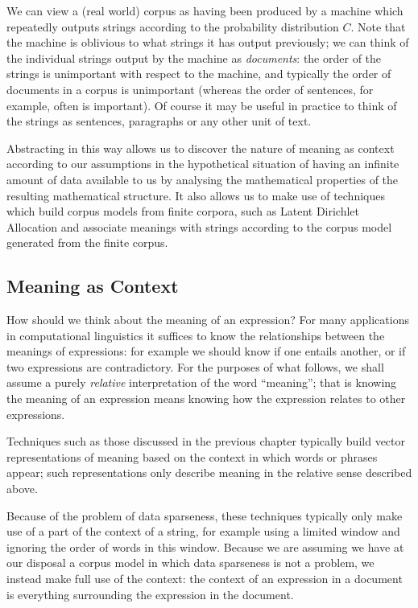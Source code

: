 We can view a (real world) corpus as having been produced by a machine which repeatedly outputs strings according to the probability distribution $C$. Note that the machine is oblivious to what strings it has output previously; we can think of the individual strings output by the machine as \emph{documents}: the order of the strings is unimportant with respect to the machine, and typically the order of documents in a corpus is unimportant (whereas the order of sentences, for example, often is important). Of course it may be useful in practice to think of the strings as sentences, paragraphs or any other unit of text.

Abstracting in this way allows us to discover the nature of meaning as context according to our assumptions in the hypothetical situation of having an infinite amount of data available to us by analysing the mathematical properties of the resulting mathematical structure. It also allows us to make use of techniques which build corpus models from finite corpora, such as Latent Dirichlet Allocation and associate meanings with strings according to the corpus model generated from the finite corpus.

\subsection{Meaning as Context}

 How should we think about the meaning of an expression? For many applications in computational linguistics it suffices to know the relationships between the meanings of expressions: for example we should know if one entails another, or if two expressions are contradictory. For the purposes of what follows, we shall assume a purely \emph{relative} interpretation of the word ``meaning''; that is knowing the meaning of an expression means knowing how the expression relates to other expressions.

Techniques such as those discussed in the previous chapter typically build vector representations of meaning based on the context in which words or phrases appear; such representations only describe meaning in the relative sense described above.

Because of the problem of data sparseness, these techniques typically only make use of a part of the context of a string, for example using a limited window and ignoring the order of words in this window. Because we are assuming we have at our disposal a corpus model in which data sparseness is not a problem, we instead make full use of the context: the context of an expression in a document is  everything surrounding the expression in the document.

